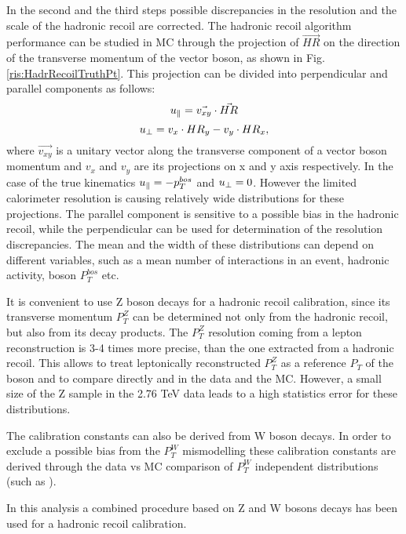 In the second and the third steps possible discrepancies in the resolution and the scale of the hadronic recoil are corrected. The hadronic recoil algorithm performance can be studied in MC through the projection of $\vec{HR}$ on the direction of the transverse momentum of the vector boson, as shown in Fig. \ref{ris:HadrRecoilTruthPt}. This projection can be divided into perpendicular \uperp and parallel \upar components as follows:
\begin{equation}
u_{\parallel}=\vec{v_{xy}}\cdot\vec{HR}
\end{equation}
\begin{equation}
u_{\perp}=v_x\cdot HR_y - v_y \cdot HR_x,
\end{equation}
where $\vec{v_{xy}}$ is a unitary vector along the transverse component of a vector boson momentum and $v_x$ and $v_y$ are its projections on x and y axis respectively. In the case of the true kinematics $u_{\parallel}=-p_T^{bos}$ and $u_{\perp} = 0$. However the limited calorimeter resolution is causing relatively wide distributions for these projections. The parallel component \upar is sensitive to a possible bias in the hadronic recoil, while the perpendicular \uperp can be used for determination of the resolution discrepancies. The mean and the width of these distributions can depend on different variables, such as a mean number of interactions in an event, hadronic activity, boson $P_{T}^{bos}$ etc. 

It is convenient to use Z boson decays for a hadronic recoil calibration, since its transverse momentum $P_T^Z$ can be determined not only from the hadronic recoil, but also from its decay products.  The $P_T^Z$ resolution coming from a lepton reconstruction is 3-4 times more precise, than the one extracted from a hadronic recoil. This allows to treat leptonically reconstructed $P_T^{Z}$ as a reference $P_T$ of the boson and to compare directly \uperp and \upar in the data and the MC. However, a small size of the Z sample in the 2.76 TeV data leads to a high statistics error for these distributions. 

The calibration constants can also be  derived from W boson decays. In order to exclude a possible bias from the $P_T^W$ mismodelling these calibration constants are derived through the data vs MC comparison of $P_T^{W}$ independent distributions (such as \mtw).  

In this analysis a combined procedure based on Z and W bosons decays has been used for a hadronic recoil calibration.

